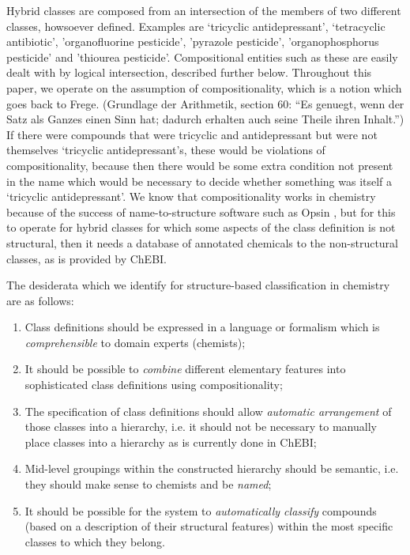 \documentclass[10pt]{bmc_article}
\newenvironment{bmcformat}{\baselineskip20pt\sloppy\setboolean{publ}{false}}{\baselineskip20pt\sloppy}
\begin{document}
\begin{bmcformat}
Hybrid classes are composed from an intersection of the members of two different classes, howsoever defined.  Examples are `tricyclic antidepressant', `tetracyclic antibiotic', 'organofluorine pesticide', 'pyrazole pesticide', 'organophosphorus pesticide' and 'thiourea pesticide'. Compositional entities such as these are easily dealt with by logical intersection, described further below. %
Throughout this paper, we operate on the assumption of compositionality, which is a notion which goes back to Frege.  (Grundlage der Arithmetik, section 60: ``Es genuegt, wenn der Satz als Ganzes einen Sinn hat; dadurch erhalten auch seine Theile ihren Inhalt.'')
If there were compounds that were tricyclic and antidepressant but were not themselves `tricyclic antidepressant's, these would be violations of compositionality, because then there would be some extra condition not present in the name which would be necessary to decide whether something was itself a `tricyclic antidepressant'.
We know that compositionality works in chemistry because of the success of name-to-structure software such as Opsin \cite{lowe2011},
but for this to operate for hybrid classes for which some aspects of the class definition is not structural, then it needs a database of annotated chemicals to the non-structural classes, as is provided by ChEBI. 

The desiderata which we identify for structure-based classification in chemistry are as follows:
\begin{enumerate}
	\item Class definitions should be expressed in a language or formalism which is \textit{comprehensible} to domain experts (chemists);
  \item It should be possible to \textit{combine} different elementary features into sophisticated class definitions using compositionality;	
	\item The specification of class definitions should allow \textit{automatic arrangement} of those classes into a hierarchy, i.e. it should not be necessary to manually place classes into a hierarchy as is currently done in ChEBI;
	\item Mid-level groupings within the constructed hierarchy should be semantic, i.e. they should make sense to chemists and be \textit{named};
	\item It should be possible for the system to \textit{automatically classify} compounds (based on a description of their structural features) within the most specific classes to which they belong. 
\end{enumerate}



\end{bmcformat}
\end{document}
